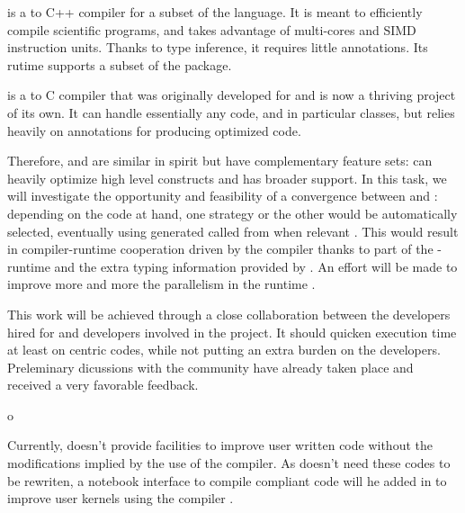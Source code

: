 \begin{workpackage}[id=hpc,wphases=36-48,
  title=High Performance Computing,
  PSRM=1, %
  LLRM=12, %
  SARM=1, %
  UKRM=1, %
  UBRM=1, %
  UJFRM=12]
\begin{tasklist}
\begin{task}[title=Pythran-Cython convergence,id=pythran_cython]

  \Pythran is a \Python to C++ compiler for a subset of the \Python
  language. It is meant to efficiently compile scientific programs,
  and takes advantage of multi-cores and SIMD instruction units.
  Thanks to type inference, it requires little annotations. Its rutime
  supports a subset of the \Numpy package.

  \Cython is a \Python to C compiler that was originally developed for
  \Sage and is now a thriving project of its own. It can handle
  essentially any \Python code, and in particular classes, but relies
  heavily on annotations for producing optimized code.

  Therefore, \Pythran and \Cython are similar in spirit but have
  complementary feature sets: \Pythran can heavily optimize high level
  \Numpy constructs and \Cython has broader \Python support. In this
  task, we will investigate the opportunity and feasibility of a
  convergence between \Cython and \Pythran: depending on the code at
  hand, one strategy or the other would be automatically selected,
  eventually using \Pythran generated called from \Cython when
  relevant . This would result in compiler-runtime
  cooperation driven by the \Cython compiler thanks to part of the
  \Pythran-runtime and the extra typing information provided by \Cython. An
  effort will be made to improve more and more the parallelism in the
  \Pythran runtime .

  This work will be achieved through a close collaboration between the \Pythran
  developers hired for \TheProject and \Cython developers involved in the \Sage
  project. It should quicken \Sage execution time at least on \Numpy centric
  codes, while not putting an extra burden on the developers.  Preleminary
  dicussions with the \Cython community have already taken place and received a
  very favorable feedback.
\end{task}

\begin{task}[title=\Pythran for \Sage and \Sage Users,id=pythran_sage]o

  Currently, \Sage doesn't provide facilities to improve user written
  \Python code without the modifications implied by the use of the \Cython
  compiler. As \Pythran doesn't need these codes to be rewriten, a notebook
  interface to compile \Pythran compliant code will he added in \Sage to
  improve user kernels using the \Pythran compiler .


\end{task}
\end{tasklist}
\end{workpackage}
